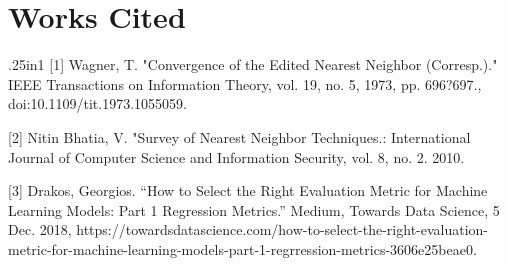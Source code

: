 \documentclass{article}
\begin{document}
\section{Works Cited}
\begin{hangparas}{.25in}{1}
[1] Wagner, T. "Convergence of the Edited Nearest Neighbor (Corresp.)." IEEE Transactions on Information Theory, vol. 19, no. 5, 1973, pp. 696?697., doi:10.1109/tit.1973.1055059.

[2] Nitin Bhatia, V. "Survey of Nearest Neighbor Techniques.: International Journal of Computer Science and Information Security, vol. 8, no. 2. 2010.

[3] Drakos, Georgios. “How to Select the Right Evaluation Metric for Machine Learning Models: Part 1 Regression Metrics.” Medium, Towards Data Science, 5 Dec. 2018, https://towardsdatascience.com/how-to-select-the-right-evaluation-metric-for-machine-learning-models-part-1-regrression-metrics-3606e25beae0.
\end{hangparas}
\end{document}
